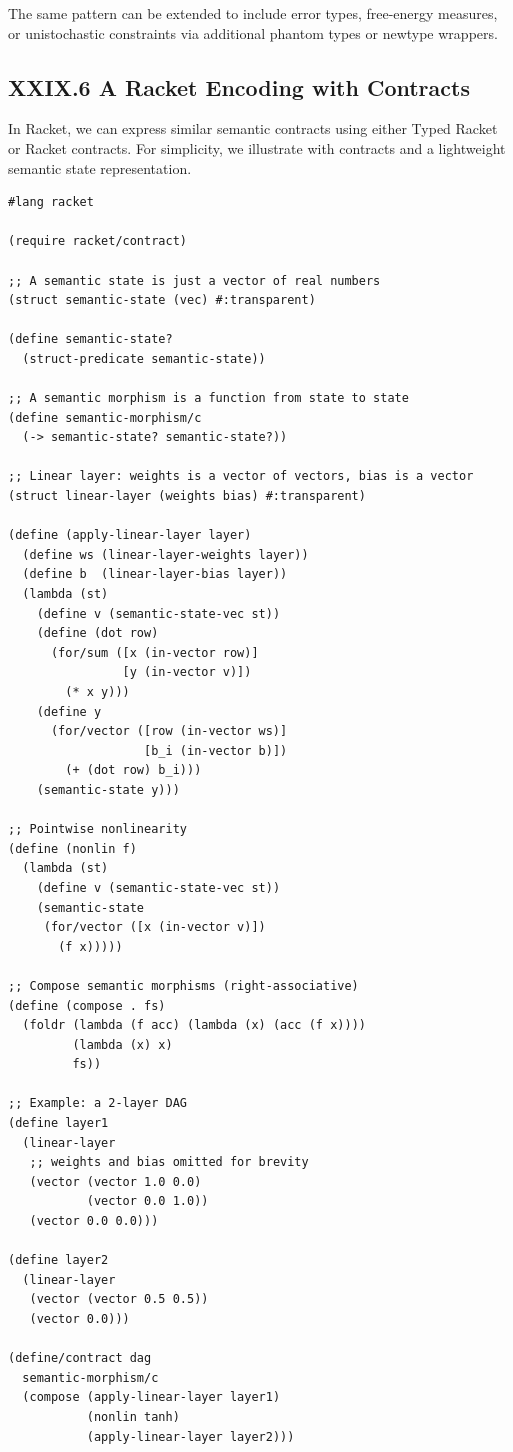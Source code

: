 \documentclass[12pt,letterpaper]{article}
\begin{document}
The same pattern can be extended to include error types, free-energy measures, or unistochastic constraints via additional phantom types or newtype wrappers.

\subsection{XXIX.6 A Racket Encoding with Contracts}

In Racket, we can express similar semantic contracts using either Typed Racket or Racket contracts. For simplicity, we illustrate with contracts and a lightweight semantic state representation.

\begin{verbatim}
#lang racket

(require racket/contract)

;; A semantic state is just a vector of real numbers
(struct semantic-state (vec) #:transparent)

(define semantic-state?
  (struct-predicate semantic-state))

;; A semantic morphism is a function from state to state
(define semantic-morphism/c
  (-> semantic-state? semantic-state?))

;; Linear layer: weights is a vector of vectors, bias is a vector
(struct linear-layer (weights bias) #:transparent)

(define (apply-linear-layer layer)
  (define ws (linear-layer-weights layer))
  (define b  (linear-layer-bias layer))
  (lambda (st)
    (define v (semantic-state-vec st))
    (define (dot row)
      (for/sum ([x (in-vector row)]
                [y (in-vector v)])
        (* x y)))
    (define y
      (for/vector ([row (in-vector ws)]
                   [b_i (in-vector b)])
        (+ (dot row) b_i)))
    (semantic-state y)))

;; Pointwise nonlinearity
(define (nonlin f)
  (lambda (st)
    (define v (semantic-state-vec st))
    (semantic-state
     (for/vector ([x (in-vector v)])
       (f x)))))

;; Compose semantic morphisms (right-associative)
(define (compose . fs)
  (foldr (lambda (f acc) (lambda (x) (acc (f x))))
         (lambda (x) x)
         fs))

;; Example: a 2-layer DAG
(define layer1
  (linear-layer
   ;; weights and bias omitted for brevity
   (vector (vector 1.0 0.0)
           (vector 0.0 1.0))
   (vector 0.0 0.0)))

(define layer2
  (linear-layer
   (vector (vector 0.5 0.5))
   (vector 0.0)))

(define/contract dag
  semantic-morphism/c
  (compose (apply-linear-layer layer1)
           (nonlin tanh)
           (apply-linear-layer layer2)))
\end{verbatim}
\end{document}
